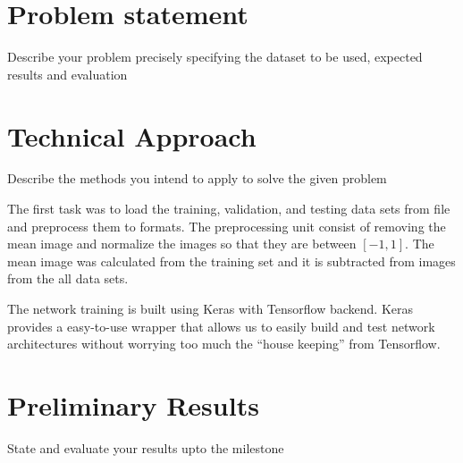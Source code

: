 \documentclass[10pt,twocolumn,letterpaper]{article}
\begin{document}
\section{Problem statement}
Describe your problem precisely specifying the dataset to be used, expected results and evaluation

\section{Technical Approach}
Describe the methods you intend to apply to solve the given problem

The first task was to load the training, validation, and testing data sets from file and preprocess them to formats. The preprocessing unit consist of removing the mean image and normalize the images so that they are between $[-1, 1]$. The mean image was calculated from the training set and it is subtracted from images from the all data sets.  

The network training is built using Keras with Tensorflow backend. Keras provides a easy-to-use wrapper that allows us to easily build and test network architectures without worrying too much the ``house keeping'' from Tensorflow. 

\section{Preliminary Results}
State and evaluate your results upto the milestone

{\small


}
\end{document}
